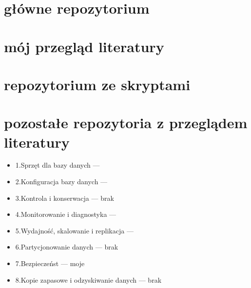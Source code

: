 \documentclass[letterpaper,10pt,polish]{sphinxmanual}
\begin{document}
\section{główne repozytorium}
\label{\detokenize{rozdzial5/index:glowne-repozytorium}}
\sphinxAtStartPar
{}


\section{mój przegląd literatury}
\label{\detokenize{rozdzial5/index:moj-przeglad-literatury}}
\sphinxAtStartPar
{}


\section{repozytorium ze skryptami}
\label{\detokenize{rozdzial5/index:repozytorium-ze-skryptami}}
\sphinxAtStartPar
{}


\section{pozostałe repozytoria z przeglądem literatury}
\label{\detokenize{rozdzial5/index:pozostale-repozytoria-z-przegladem-literatury}}\begin{itemize}
\item {} 
\sphinxAtStartPar
1.Sprzęt dla bazy danych — 

\item {} 
\sphinxAtStartPar
2.Konfiguracja bazy danych — 

\item {} 
\sphinxAtStartPar
3.Kontrola i konserwacja — brak

\item {} 
\sphinxAtStartPar
4.Monitorowanie i diagnostyka — 

\item {} 
\sphinxAtStartPar
5.Wydajność, skalowanie i replikacja — 

\item {} 
\sphinxAtStartPar
6.Partycjonowanie danych — brak

\item {} 
\sphinxAtStartPar
7.Bezpieczeńst — moje

\item {} 
\sphinxAtStartPar
8.Kopie zapasowe i odzyskiwanie danych — brak

\end{itemize}
\end{document}
